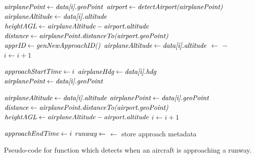         \begin{algorithm}
            \begin{algorithmic}[1]\raggedright
            	\State $ \textit{airplanePoint} \gets \textit{data[i].geoPoint} $
            	\State $ \textit{airport} \gets \textit{detectAirport(airplanePoint)} $
                \State $ \textit{airplaneAltitude} \gets \textit{data[i].altitude} $
                \State $ \textit{heightAGL} \gets \textit{airplaneAltitude} - \textit{airport.altitude} $
                \State $ \textit{distance} \gets \textit{airplanePoint.distanceTo(airport.geoPoint)} $
                    \State $ \textit{apprID} \gets \textit{genNewApproachID()} $
                        \State $ \textit{airplaneAltitude} \gets \textit{data[i].altitude} $
                        \State {} $ \gets $  $-$ 
                        \State $ i \gets i + 1 $
                    \EndWhile

                    \State $ \textit{approachStartTime} \gets i $
                    \State $ \textit{airplaneHdg} \gets \textit{data[i].hdg} $
                    \State $ \textit{airplanePoint} \gets \textit{data[i].geoPoint} $

                        \State $ \textit{airplaneAltitude} \gets \textit{data[i].altitude} $
                        \State $ \textit{airplanePoint} \gets \textit{data[i].geoPoint} $
                        \State $ \textit{distance} \gets \textit{airplanePoint.distanceTo(airport.geoPoint)} $
                        \State $ \textit{heightAGL} \gets \textit{airplaneAltitude} - \textit{airport.altitude} $
                        \State $ i \gets i + 1 $
                    \EndWhile

                    \State $ \textit{approachEndTime} \gets i $
                    \State $ \textit{runway} \gets $ 
                    \State {} $ \gets $ store approach metadata
                    \State \Return {}
                \EndIf
            \end{algorithmic}
            \caption{Pseudo-code for function which detects when an aircraft is approaching a runway.}
            \label{alg:detect_approach}
        \end{algorithm}
        
